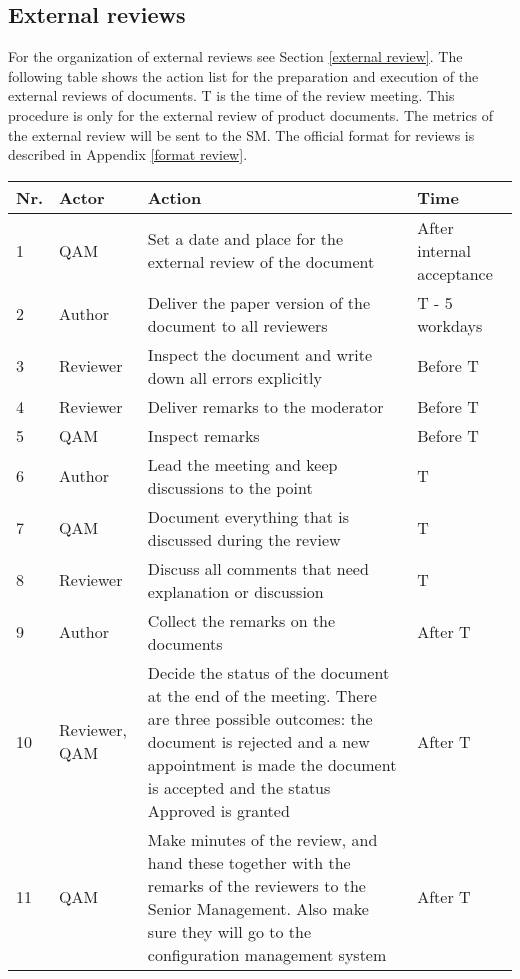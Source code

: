 \documentclass[%
		pathtobase=..,%
		titlefull={Software Validation and Verification Plan},%
		titleabbr=SVVP,%
		version=0.1]{fingerpaint}
\begin{document}
\subsection{External reviews} \label{external review details}
    For the organization of external reviews see Section \ref{external review}. The following table shows the action list for
    the preparation and execution of the external reviews of documents. T is the time of the review
    meeting. This procedure is only for the external review of product documents. The metrics of
    the external review will be sent to the SM. The official format for reviews is described in Appendix \ref{format review}.

\begin{tabular}{|l|p{6em}|p{20em}|p{6em}|}
\hline
Nr. &Actor &     Action       &                                                Time\\
\hline
1  & QAM   &      Set a date and place for the external review of the document & After internal acceptance\\
2  & Author    & Deliver the paper version of the document to all reviewers  & T - 5 workdays\\
3  & Reviewer &Inspect the document and write down all errors explicitly     & Before T\\
4  & Reviewer &Deliver remarks to the moderator                              & Before T\\
5  & QAM      &  Inspect remarks                                             & Before T\\
6  & Author   &  Lead the meeting and keep discussions to the point          & T\\
7  & QAM      &  Document everything that is discussed during the review     & T\\
8  & Reviewer &Discuss all comments that need explanation or discussion     &  T\\
9  & Author   &  Collect the remarks on the documents                       &  After T\\
10 & Reviewer, QAM & Decide the status of the document at the end of the meeting. There are three possible outcomes: the document is rejected and a new appointment is made the document is accepted and the status Approved is granted  & After T\\
11 & QAM     &  Make minutes of the review, and hand these together with the remarks of the reviewers to the Senior Management. Also make sure they will go to the configuration management system  & After T\\
\hline               
\end{tabular}
\end{document}
